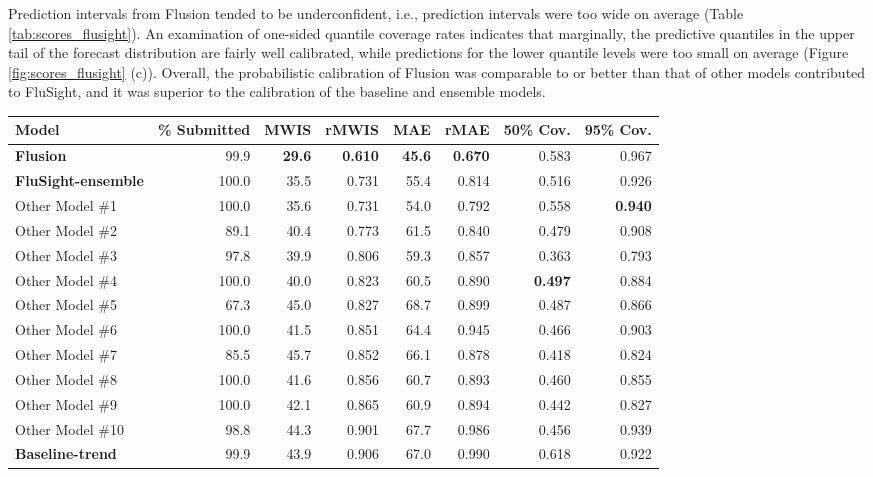 \documentclass{article}\usepackage[]{graphicx}\usepackage[]{xcolor}
\begin{document}
Prediction intervals from Flusion tended to be underconfident, i.e., prediction intervals were too wide on average (Table \ref{tab:scores_flusight}). An examination of one-sided quantile coverage rates indicates that marginally, the predictive quantiles in the upper tail of the forecast distribution are fairly well calibrated, while predictions for the lower quantile levels were too small on average (Figure \ref{fig:scores_flusight} (c)). Overall, the probabilistic calibration of Flusion was comparable to or better than that of other models contributed to FluSight, and it was superior to the calibration of the baseline and ensemble models.

\begin{table}[ht]
\centering
\begin{tabular}{lrrrrrrr}
  \toprule
Model & \% Submitted & MWIS & rMWIS & MAE & rMAE & 50\% Cov. & 95\% Cov. \\ 
  \midrule
\textbf{Flusion} & 99.9 & \textbf{29.6} & \textbf{0.610} & \textbf{45.6} & \textbf{0.670} & 0.583 & 0.967 \\ 
  \textbf{FluSight-ensemble} & 100.0 & 35.5 & 0.731 & 55.4 & 0.814 & 0.516 & 0.926 \\ 
  Other Model \#1 & 100.0 & 35.6 & 0.731 & 54.0 & 0.792 & 0.558 & \textbf{0.940} \\ 
  Other Model \#2 & 89.1 & 40.4 & 0.773 & 61.5 & 0.840 & 0.479 & 0.908 \\ 
  Other Model \#3 & 97.8 & 39.9 & 0.806 & 59.3 & 0.857 & 0.363 & 0.793 \\ 
  Other Model \#4 & 100.0 & 40.0 & 0.823 & 60.5 & 0.890 & \textbf{0.497} & 0.884 \\ 
  Other Model \#5 & 67.3 & 45.0 & 0.827 & 68.7 & 0.899 & 0.487 & 0.866 \\ 
  Other Model \#6 & 100.0 & 41.5 & 0.851 & 64.4 & 0.945 & 0.466 & 0.903 \\ 
  Other Model \#7 & 85.5 & 45.7 & 0.852 & 66.1 & 0.878 & 0.418 & 0.824 \\ 
  Other Model \#8 & 100.0 & 41.6 & 0.856 & 60.7 & 0.893 & 0.460 & 0.855 \\ 
  Other Model \#9 & 100.0 & 42.1 & 0.865 & 60.9 & 0.894 & 0.442 & 0.827 \\ 
  Other Model \#10 & 98.8 & 44.3 & 0.901 & 67.7 & 0.986 & 0.456 & 0.939 \\ 
  \textbf{Baseline-trend} & 99.9 & 43.9 & 0.906 & 67.0 & 0.990 & 0.618 & 0.922 \\ 

\end{tabular}
\end{table}
\end{document}
